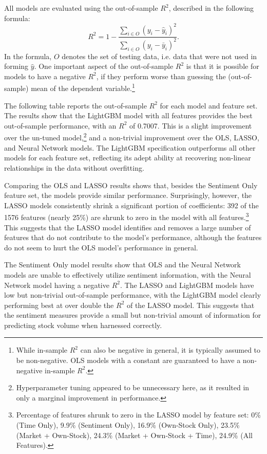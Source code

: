 \documentclass[12pt]{article}
\begin{document}
All models are evaluated using the out-of-sample $R^2$, described in the following formula:
\begin{equation}
    R^2 = 1 - \frac{\sum_{i\in O} (y_i - \hat{y}_i)^2}{\sum_{i\in O} (y_i - \bar{y}_i)^2}.
\end{equation}
In the formula, $O$ denotes the set of testing data, i.e. data that were not used in forming $\hat{y}$. One important aspect of the out-of-sample $R^2$ is that it is possible for models to have a negative $R^2$, if they perform worse than guessing the (out-of-sample) mean of the dependent variable.\footnote{While in-sample $R^2$ can also be negative in general, it is typically assumed to be non-negative. OLS models with a constant are guaranteed to have a non-negative in-sample $R^2$.}

The following table reports the out-of-sample $R^2$ for each model and feature set. The results show that the LightGBM model with all features provides the best out-of-sample performance, with an $R^2$ of 0.7007. This is a slight improvement over the un-tuned model,\footnote{Hyperparameter tuning appeared to be unnecessary here, as it resulted in only a marginal improvement in performance.} and a non-trivial improvement over the OLS, LASSO, and Neural Network models. The LightGBM specification outperforms all other models for each feature set, reflecting its adept ability at recovering non-linear relationships in the data without overfitting.



Comparing the OLS and LASSO results shows that, besides the Sentiment Only feature set, the models provide similar performance. Surprisingly, however, the LASSO models consistently shrink a significant portion of coefficients: 392 of the 1576 features (nearly 25\%) are shrunk to zero in the model with all features.\footnote{Percentage of features shrunk to zero in the LASSO model by feature set: 0\% (Time Only), 9.9\% (Sentiment Only), 16.9\% (Own-Stock Only), 23.5\% (Market + Own-Stock), 24.3\% (Market + Own-Stock + Time), 24.9\% (All Features).} This suggests that the LASSO model identifies and removes a large number of features that do not contribute to the model's performance, although the features do not seem to hurt the OLS model's performance in general.

The Sentiment Only model results show that OLS and the Neural Network models are unable to effectively utilize sentiment information, with the Neural Network model having a negative $R^2$. The LASSO and LightGBM models have low but non-trivial out-of-sample performance, with the LightGBM model clearly performing best at over double the $R^2$ of the LASSO model. This suggests that the sentiment measures provide a small but non-trivial amount of information for predicting stock volume when harnessed correctly.
\end{document}
